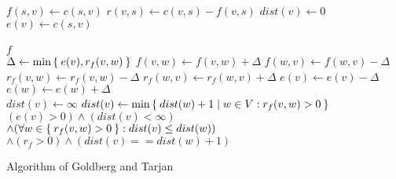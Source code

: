 \documentclass{article}
\begin{document}
\begin{preview}
\begin{algorithm}[H]
\begin{algorithmic}
                    \State $f(s,v) \gets c(s,v)$    
                    \State $r(v,s) \gets c(v,s) - f(v,s)$
                    \State $dist(v) \gets 0$
                    \State $e(v) \gets c(s,v)$ 
                \EndFor
                \\
                        \State {}
                        \State {}
                    \EndIf
                \EndWhile
                \\
                \State \Return $f$ 
             \EndFunction
            \\
                \State $\Delta \gets \min\Set{e(v), r_f(v,w)}$
                \State $f(v,w) \gets f(v,w) + \Delta$
                \State $f(w,v) \gets f(w,v) - \Delta$
                \State $r_f(v,w) \gets r_f(v,w) - \Delta$
                \State $r_f(w,v) \gets r_f(w,v) + \Delta$
                \State $e(v) \gets e(v) - \Delta$
                \State $e(w) \gets e(w) + \Delta$
            \EndFunction
            \\
                    \State $dist(v) \gets \infty$
                \Else
                    \State $dist(v) \gets \min\Set{dist(w)+1|w \in V: r_f(v,w) > 0}$
                \EndIf
            \EndFunction
            \\
                \State\Return $(e(v) > 0) \land (dist(v) < \infty)$
            \EndFunction
            \\
                \State\Return {} $\land (\forall w \in \Set{r_f(v,w) >0}: dist(v) \leq dist(w))$
            \EndFunction
            \\
                \State\Return {} $\land (r_f > 0) \land (dist(v) == dist(w)+1)$
            \EndFunction
        \end{algorithmic}
    \caption{Algorithm of Goldberg and Tarjan}
    \label{alg:seq1}
    \end{algorithm}
\end{preview}
\end{document}
